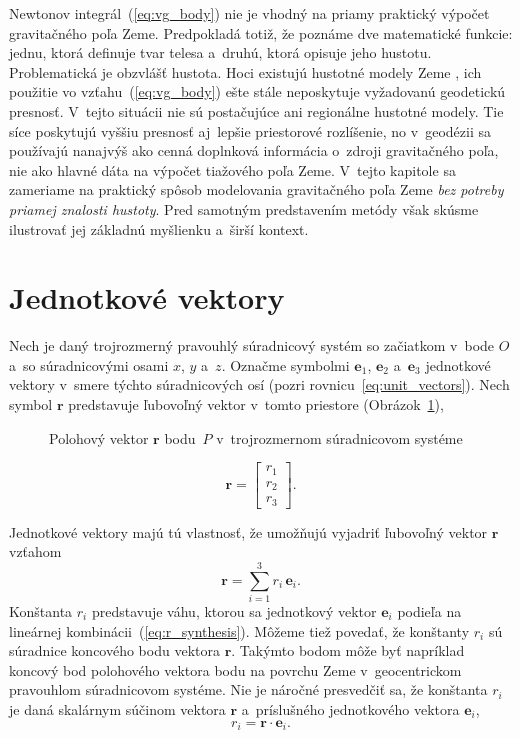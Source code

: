 \documentclass[a4paper,12pt]{book}
\let\vec\mathbf
\begin{document}
Newtonov integrál~(\ref{eq:vg_body}) nie je vhodný na priamy praktický výpočet 
gravitačného poľa Zeme.  Predpokladá totiž, že poznáme dve matematické funkcie: 
jednu, ktorá definuje tvar telesa a~druhú, ktorá opisuje jeho hustotu.  
Problematická je obzvlášť hustota.  Hoci existujú hustotné modely Zeme 
\parencite[napríklad][]{Dziewonski1981}, ich použitie vo 
vzťahu~(\ref{eq:vg_body}) ešte stále neposkytuje vyžadovanú geodetickú 
presnosť.  V~tejto situácii nie sú postačujúce ani regionálne hustotné modely.  
Tie síce poskytujú vyššiu presnosť aj~lepšie priestorové rozlíšenie, no 
v~geodézii sa používajú nanajvýš ako cenná doplnková informácia o~zdroji 
gravitačného poľa, nie ako hlavné dáta na výpočet tiažového poľa Zeme.  V~tejto 
kapitole sa zameriame na praktický spôsob modelovania gravitačného poľa Zeme 
\emph{bez potreby priamej znalosti hustoty}.  Pred samotným predstavením metódy 
však skúsme ilustrovať jej základnú myšlienku a~širší kontext.






\section{Jednotkové vektory}
\label{sec:unit_vectors}

Nech je daný trojrozmerný pravouhlý súradnicový systém so začiatkom v~bode $O$
a~so súradnicovými osami $x$, $y$ a~$z$.  Označme symbolmi $\vec e_1$, $\vec
e_2$ a~$\vec e_3$ jednotkové vektory v~smere týchto súradnicových osí (pozri 
rovnicu~\ref{eq:unit_vectors}).  Nech symbol $\vec r$ predstavuje ľubovoľný 
vektor v~tomto priestore (Obrázok~\ref{fig:unit_vectors}),
%
\begin{figure}
\centering

\caption{Polohový vektor $\vec r$ bodu~$P$ v~trojrozmernom súradnicovom 
systéme}
\label{fig:unit_vectors}
\end{figure}

\begin{equation}
\vec r =
\begin{bmatrix}
r_1\\
r_2\\
r_3
\end{bmatrix}
{.}
\end{equation}

Jednotkové vektory majú tú vlastnosť, že umožňujú vyjadriť ľubovoľný vektor
$\vec r$ vzťahom
%
\begin{equation}
\label{eq:r_synthesis}
\vec r = \sum_{i = 1}^3 r_i \, \vec e_i{.}
\end{equation}
%
Konštanta $r_i$ predstavuje váhu, ktorou sa jednotkový vektor $\vec e_i$
podieľa na lineárnej kombinácii~(\ref{eq:r_synthesis}).  Môžeme tiež povedať,
že konštanty $r_i$ sú súradnice koncového bodu vektora $\vec r$.  Takýmto bodom
môže byť napríklad koncový bod polohového vektora bodu na povrchu Zeme
v~geocentrickom pravouhlom súradnicovom systéme.  Nie je náročné presvedčiť sa,
že konštanta $r_i$ je daná skalárnym súčinom vektora $\vec r$ a~príslušného
jednotkového vektora $\vec e_i$,
%
\begin{equation}
\label{eq:r_analysis}
r_i = \vec r \cdot \vec e_i{.}
\end{equation}
\end{document}
